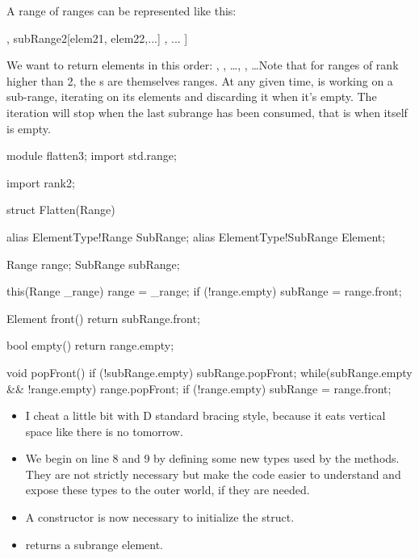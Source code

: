 A range of ranges can be represented like this:

\begin{dcode}
[ subRange1[elem11, elem12,...]
, subRange2[elem21, elem22,...] 
, ... ]
\end{dcode}

We want  to return elements in this order: , , \ldots  {}, , \ldots Note that for ranges of rank higher than 2, the s are themselves ranges. At any given time,  is working on a sub-range, iterating on its elements and discarding it when it's empty. The iteration will stop when the last subrange has been consumed, that is when  itself is empty.

\begin{ndcode}
module flatten3;
import std.range;

import rank2;

struct Flatten(Range)
{
    alias ElementType!Range    SubRange;
    alias ElementType!SubRange Element;

    Range range;
    SubRange subRange;

    this(Range _range) {
        range = _range;
        if (!range.empty) subRange = range.front;
    }

    Element front() { return subRange.front;}

    bool empty() { return range.empty;}

    void popFront() {
        if (!subRange.empty) subRange.popFront;
        while(subRange.empty && !range.empty) {
            range.popFront;
            if (!range.empty) subRange = range.front;
        }
    }
}
\end{ndcode}

\begin{itemize}
\item I cheat a little bit with D standard bracing style, because it eats vertical space like there is no tomorrow.
\item We begin on line 8 and 9 by defining some new types used by the methods. They are not strictly necessary but make the code easier to understand and expose these types to the outer world, if they are needed.
\item A constructor is now necessary to initialize the struct.
\item {} returns a subrange element.
\end{itemize}

